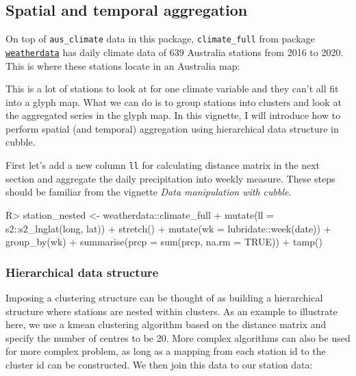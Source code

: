 \documentclass[
]{jss}
\begin{document}
\hypertarget{spatial-and-temporal-aggregation}{%
\subsection{Spatial and temporal
aggregation}\label{spatial-and-temporal-aggregation}}

On top of \texttt{aus\_climate} data in this package,
\texttt{climate\_full} from package
\href{https://github.com/huizezhang-sherry/weatherdata}{\texttt{weatherdata}}
has daily climate data of 639 Australia stations from 2016 to 2020. This
is where these stations locate in an Australia map:

This is a lot of stations to look at for one climate variable and they
can't all fit into a glyph map. What we can do is to group stations into
clusters and look at the aggregated series in the glyph map. In this
vignette, I will introduce how to perform spatial (and temporal)
aggregation using hierarchical data structure in cubble.

First let's add a new column \texttt{ll} for calculating distance matrix
in the next section and aggregate the daily precipitation into weekly
measure. These steps should be familiar from the vignette \emph{Data
manipulation with cubble}.

\begin{CodeChunk}
\begin{CodeInput}
R> station_nested <- weatherdata::climate_full %
+   mutate(ll = s2::s2_lnglat(long, lat)) %
+   stretch() %
+   mutate(wk = lubridate::week(date)) %
+   group_by(wk) %
+   summarise(prcp = sum(prcp, na.rm = TRUE)) %
+   tamp()
\end{CodeInput}
\end{CodeChunk}

\hypertarget{hierarchical-data-structure}{%
\subsubsection{Hierarchical data
structure}\label{hierarchical-data-structure}}

Imposing a clustering structure can be thought of as building a
hierarchical structure where stations are nested within clusters. As an
example to illustrate here, we use a kmean clustering algorithm based on
the distance matrix and specify the number of centres to be 20. More
complex algorithms can also be used for more complex problem, as long as
a mapping from each station id to the cluster id can be constructed. We
then join this data to our station data:
\end{document}
